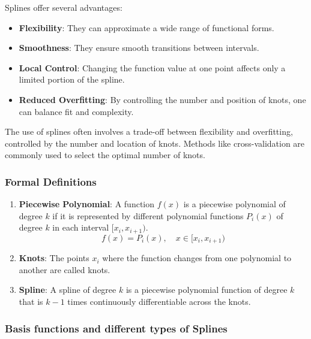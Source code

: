 \documentclass[12pt, twoside,hidelinks]{article}
\theoremstyle{definition}
\numberwithin{equation}{section}
\begin{document}
Splines offer several advantages:

\begin{itemize}
    \item \textbf{Flexibility}: They can approximate a wide range of functional forms.
    \item \textbf{Smoothness}: They ensure smooth transitions between intervals.
    \item \textbf{Local Control}: Changing the function value at one point affects only a limited portion of the spline.
    \item \textbf{Reduced Overfitting}: By controlling the number and position of knots, one can balance fit and complexity.
\end{itemize}

The use of splines often involves a trade-off between flexibility and overfitting, controlled by the number and location of knots. Methods like cross-validation are commonly used to select the optimal number of knots.

\subsubsection{Formal Definitions}
\begin{enumerate}
    \item \textbf{Piecewise Polynomial}: A function \( f(x) \) is a piecewise polynomial of degree \( k \) if it is represented by different polynomial functions \( P_i(x) \) of degree \( k \) in each interval \( [x_{i}, x_{i+1}) \).
    \[
    f(x) = P_i(x), \quad x \in [x_{i}, x_{i+1})
    \]
    
    \item \textbf{Knots}: The points \( x_i \) where the function changes from one polynomial to another are called knots.
    
    \item \textbf{Spline}: A spline of degree \( k \) is a piecewise polynomial function of degree \( k \) that is \( k-1 \) times continuously differentiable across the knots.
\end{enumerate}

\subsubsection{Basis functions and different types of Splines}
\end{document}

